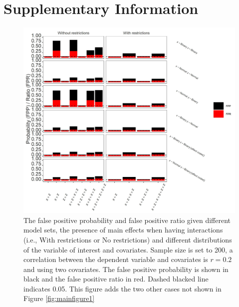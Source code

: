 
\part*{Supplementary Information} 

\begin{figure}[hbt!]
\includegraphics[scale=0.95]{R/Analysis/Result/Figures/Figure1ASI.jpeg}
\centering
\caption{The false positive probability and false positive ratio given different model sets, the presence of main effects when having interactions (i.e., With restrictions or No restrictions) and different distributions of the variable of interest and covariates. Sample size is set to 200, a correlation between the dependent variable and covariates is $\textit{r}=0.2$ and using two covariates. The false positive probability is shown in black and the false positive ratio in red. Dashed blacked line indicates 0.05. This figure adds the two other cases not shown in Figure \ref{fig:mainfigure1}}
\label{fig:appfigure1}
\end{figure}

